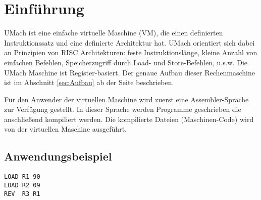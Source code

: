 \chapter{Einführung}
UMach ist eine einfache virtuelle Maschine (VM), die einen definierten
Instruktionssatz und eine definierte Architektur hat. UMach orientiert
sich dabei an Prinzipien von RISC Architekturen: feste Instruktionslänge,
kleine Anzahl von einfachen Befehlen, Speicherzugriff durch Load- und
Store-Befehlen, u.s.w. Die UMach Maschine ist Register-basiert.
Der genaue Aufbau dieser Rechenmaschine ist im Abschnitt
\ref{sec:Aufbau} ab der Seite \pageref{sec:Aufbau} beschrieben.


Für den Anwender der virtuellen Maschine wird zuerst eine Assembler-Sprache zur
Verfügung gestellt. In dieser Sprache werden Programme geschrieben die
anschließend kompiliert werden. Die kompilierte Dateien (Maschinen-Code) wird
von der virtuellen Maschine ausgeführt.

\section{Anwendungsbeispiel}



\begin{lstlisting}
LOAD R1 90
LOAD R2 09
REV  R3 R1
\end{lstlisting}



